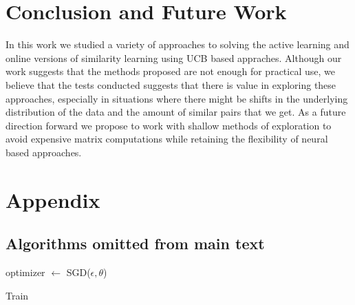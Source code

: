 \documentclass{article}
\begin{document}
\section{Conclusion and Future Work}
In this work we studied a variety of approaches to solving the active learning and online versions of similarity learning using UCB based appraches.
Although our work suggests that the methods proposed are not enough for practical use, we believe that the tests conducted suggests that there is
value in exploring these approaches, especially in situations where there might be shifts in the underlying distribution of the data and the
amount of similar pairs that we get.
As a future direction forward we propose to work with shallow methods of exploration to avoid expensive matrix computations while
retaining the flexibility of neural based approaches.




\newpage
\appendix
\section{Appendix}

\subsection{Algorithms omitted from main text}

\begin{algorithm}

    optimizer $\gets$ SGD($\epsilon, \theta$)\;
    \caption{Train}\label{algo:train}
  \end{algorithm}
\end{document}

